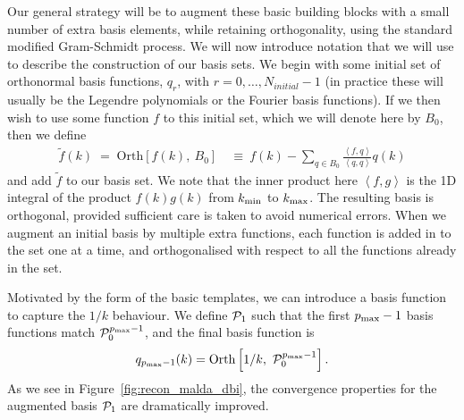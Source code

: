 Our general strategy will be to augment these basic building blocks
with a small number of extra basis elements, while retaining orthogonality,
using the standard modified Gram-Schmidt process.
We will now introduce notation that we will use to describe the construction of our basis sets.
We begin with some initial set of orthonormal basis functions, $q_r$, with $r=0,\ldots,N_{initial}-1$
(in practice these will usually be the
Legendre polynomials or the Fourier basis functions).
If we then wish to use some function $f$ to this initial set, which we will denote here by $B_0$,
then we define
\begin{align}\label{gram_schmidt}
    \tilde {f}(k) \;=\;  \text{Orth}\left [f(k),~B_0\right] &~\equiv~ f(k) - \sum_{q\in B_0}\frac{\left\langle f,q \right\rangle}{\left\langle q,q \right\rangle}q(k)
\end{align}
and add $\tilde{f}$ to our basis set.
We note that the inner product here $\left\langle f,g \right\rangle$
is the 1D integral of the product $f(k)g(k)$ from ${k_\text{min}}$ to ${k_\text{max}}$.
The resulting basis is orthogonal, provided sufficient
care is taken to avoid numerical errors.
When we augment an initial basis by multiple extra functions, each function
is added in to the set one at a time, and orthogonalised with respect to all the
functions already in the set.


Motivated by the form of the basic templates, we can introduce a basis function to capture the $1/k$ behaviour.
We define $\mathcal{P}_1$ such that the first $p_\text{max}-1$ basis functions match $\mathcal{P}_0^{p_\text{max}-1}$,
and the final basis function is
\begin{align}\label{P1_definition}
    q_{p_\text{max}-1}(k) = \text{Orth}\left[{1}/ {k},~\mathcal{P}_0^{p_\text{max}-1}\right].
\end{align}
As we see in Figure~\ref{fig:recon_malda_dbi}, the convergence properties for the augmented basis  $\mathcal{P}_1$ are dramatically improved.


